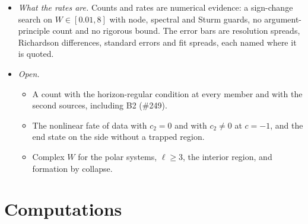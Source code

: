 \documentclass[11pt]{article}
\theoremstyle{plain}
\begin{document}
\begin{itemize}
  language the lemma says that the horizon's sections are minimal, so that the stability operator of~\cite{Mars12} has
  zero principal eigenvalue (its Thm.~1) and the gauge condition $\delta\vartheta=0$ of~\cite{HW13} cannot be imposed. We
  found no paper that states this for $\delta r$ or draws the growth at $\kappa$.
\item \emph{What the rates are.} Counts and rates are numerical evidence: a sign-change search on $W\in[0.01, 8]$ with
  node, spectral and Sturm guards, no argument-principle count and no rigorous bound. The error bars are resolution spreads,
  Richardson differences, standard errors and fit spreads, each named where it is quoted.
\item \emph{Open.}
  \begin{itemize}
  \item A count with the horizon-regular condition at every member and with the second sources, including B2 (\#249).
  \item The nonlinear fate of data with $c_2=0$ and with $c_2\ne0$ at $c=-1$, and the end state on the side without a
    trapped region.
  \item Complex $W$ for the polar systems, $\ell\ge3$, the interior region, and formation by collapse.
  \end{itemize}
\end{itemize}

\section{Computations}\label{sec:computations}
\end{document}

